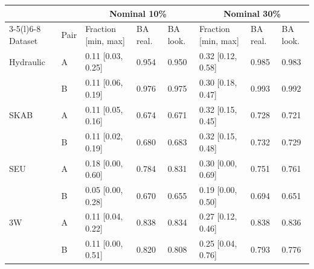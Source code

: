 \begin{tabular}{@{}l l lll lll@{}}
\toprule
& & \multicolumn{3}{c}{Nominal 10\%} & \multicolumn{3}{c}{Nominal 30\%} \\
\cmidrule(lr){3-5}\cmidrule(l){6-8}
Dataset & Pair & Fraction [min, max] & BA real. & BA look. & Fraction [min, max] & BA real. & BA look. \\
\midrule
Hydraulic & A & 0.11 [0.03, 0.25] & 0.954 & 0.950 & 0.32 [0.12, 0.58] & 0.985 & 0.983 \\
 & B & 0.11 [0.06, 0.19] & 0.976 & 0.975 & 0.30 [0.18, 0.47] & 0.993 & 0.992 \\
SKAB & A & 0.11 [0.05, 0.16] & 0.674 & 0.671 & 0.32 [0.15, 0.45] & 0.728 & 0.721 \\
 & B & 0.11 [0.02, 0.19] & 0.680 & 0.683 & 0.32 [0.15, 0.48] & 0.732 & 0.729 \\
SEU & A & 0.18 [0.00, 0.60] & 0.784 & 0.831 & 0.30 [0.00, 0.69] & 0.751 & 0.761 \\
 & B & 0.05 [0.00, 0.28] & 0.670 & 0.655 & 0.19 [0.00, 0.50] & 0.694 & 0.651 \\
3W & A & 0.11 [0.04, 0.22] & 0.838 & 0.834 & 0.27 [0.12, 0.46] & 0.838 & 0.836 \\
 & B & 0.11 [0.00, 0.51] & 0.820 & 0.808 & 0.25 [0.04, 0.76] & 0.793 & 0.776 \\
\bottomrule
\end{tabular}
